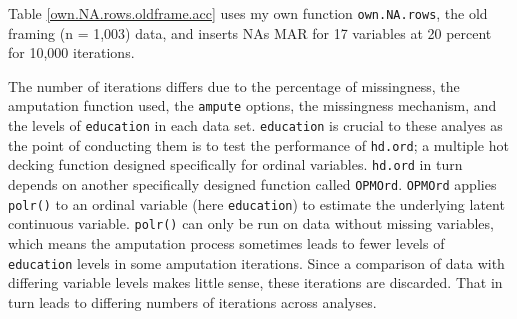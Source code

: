 \documentclass[12pt,econ]{sources/authesis}
\begin{document}
Table \ref{own.NA.rows.oldframe.acc} uses my own function \texttt{own.NA.rows}, the old framing (n = 1,003) data, and inserts NAs MAR for 17 variables at 20 percent for 10,000 iterations.

The number of iterations differs due to the percentage of missingness, the amputation function used, the \texttt{ampute} options, the missingness mechanism, and the levels of \texttt{education} in each data set. \texttt{education} is crucial to these analyes as the point of conducting them is to test the performance of \texttt{hd.ord}; a multiple hot decking function designed specifically for ordinal variables. \texttt{hd.ord} in turn depends on another specifically designed function called \texttt{OPMOrd}. \texttt{OPMOrd} applies \texttt{polr()} to an ordinal variable (here \texttt{education}) to estimate the underlying latent continuous variable. \texttt{polr()} can only be run on data without missing variables, which means the amputation process sometimes leads to fewer levels of \texttt{education} levels in some amputation iterations. Since a comparison of data with differing variable levels makes little sense, these iterations are discarded. That in turn leads to differing numbers of iterations across analyses.
\end{document}
